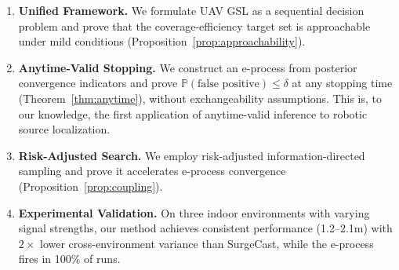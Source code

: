 \begin{enumerate}
\item \textbf{Unified Framework.} We formulate UAV GSL as a sequential decision problem and prove that the coverage-efficiency target set is approachable under mild conditions (Proposition~\ref{prop:approachability}).

\item \textbf{Anytime-Valid Stopping.} We construct an e-process from posterior convergence indicators and prove $\mathbb{P}(\text{false positive}) \leq \delta$ at any stopping time (Theorem~\ref{thm:anytime}), without exchangeability assumptions. This is, to our knowledge, the first application of anytime-valid inference to robotic source localization.

\item \textbf{Risk-Adjusted Search.} We employ risk-adjusted information-directed sampling and prove it accelerates e-process convergence (Proposition~\ref{prop:coupling}).

\item \textbf{Experimental Validation.} On three indoor environments with varying signal strengths, our method achieves consistent performance (1.2--2.1m) with $2\times$ lower cross-environment variance than SurgeCast, while the e-process fires in 100\% of runs.
\end{enumerate}